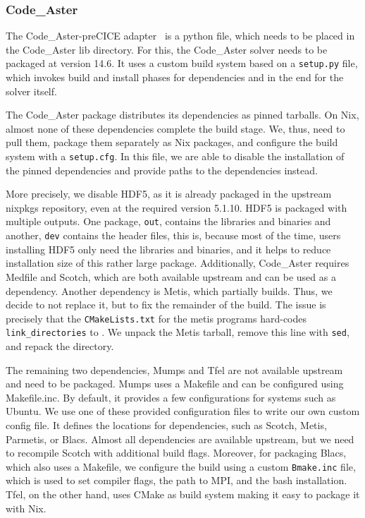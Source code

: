 \documentclass{eceasst}
\begin{document}
\subsubsection{Code\_Aster}

The Code\_Aster-preCICE adapter~\cite{Uekermann2017_Adapters} is a python file, which needs to be placed in the Code\_Aster lib directory.
For this, the Code\_Aster solver needs to be packaged at version 14.6.
It uses a custom build system based on a \texttt{setup.py} file, which invokes build and install phases for dependencies and in the end for the solver itself.

The Code\_Aster package distributes its dependencies as pinned tarballs.
On Nix, almost none of these dependencies complete the build stage. We, thus, need to pull them, package them separately as Nix packages, and configure the build system with a \texttt{setup.cfg}.
In this file, we are able to disable the installation of the pinned dependencies and provide paths to the dependencies instead.

More precisely, we disable HDF5, as it is already packaged in the upstream nixpkgs repository, even at the required version 5.1.10.
HDF5 is packaged with multiple outputs.
One package, \texttt{out}, contains the libraries and binaries and another, \texttt{dev} contains the header files, this is, because most of the time, users installing HDF5 only need the libraries and binaries, and it helps to reduce installation size of this rather large package.
Additionally, Code\_Aster requires Medfile and Scotch, which are both available upstream and can be used as a dependency.
Another dependency is Metis, which partially builds. Thus, we decide to not replace it, but to fix the remainder of the build.
The issue is precisely that the \texttt{CMakeLists.txt} for the metis programs hard-codes \texttt{link\_directories} to . We unpack the Metis tarball, remove this line with \texttt{sed}, and repack the directory.

The remaining two dependencies, Mumps and Tfel are not available upstream and need to be packaged.
Mumps uses a Makefile and can be configured using Makefile.inc. By default, it provides a few configurations for systems such as Ubuntu. We use one of these provided configuration files to write our own custom config file.
It defines the locations for dependencies, such as Scotch, Metis, Parmetis, or Blacs.
Almost all dependencies are available upstream, but we need to recompile Scotch with additional build flags.
Moreover, for packaging Blacs, which also uses a Makefile, we configure the build using a custom \texttt{Bmake.inc} file, which is used to set compiler flags, the path to MPI, and the bash installation.
Tfel, on the other hand, uses CMake as build system making it easy to package it with Nix.
\end{document}
